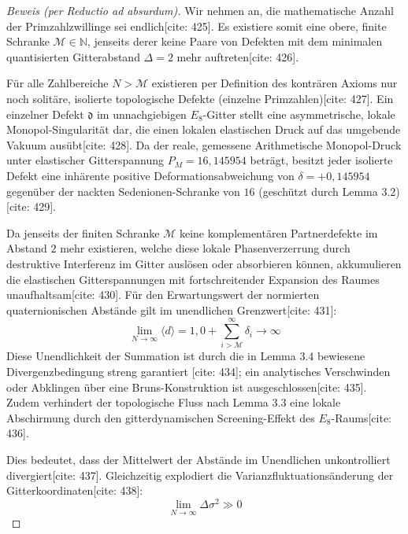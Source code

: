 \documentclass[11pt,a4paper]{article}
\newcommand{\Eoct}{E_8}
\theoremstyle{definition}
\begin{document}
	\begin{proof}[Beweis (per Reductio ad absurdum)]
		Wir nehmen an, die mathematische Anzahl der Primzahlzwillinge sei endlich[cite: 425]. Es existiere somit eine obere, finite Schranke $\mathcal{M} \in \mathbb{N}$, jenseits derer keine Paare von Defekten mit dem minimalen quantisierten Gitterabstand $\Delta = 2$ mehr auftreten[cite: 426].
		
		Für alle Zahlbereiche $N > \mathcal{M}$ existieren per Definition des konträren Axioms nur noch solitäre, isolierte topologische Defekte (einzelne Primzahlen)[cite: 427]. Ein einzelner Defekt $\mathfrak{d}$ im unnachgiebigen $\Eoct$-Gitter stellt eine asymmetrische, lokale Monopol-Singularität dar, die einen lokalen elastischen Druck auf das umgebende Vakuum ausübt[cite: 428]. Da der reale, gemessene Arithmetische Monopol-Druck unter elastischer Gitterspannung $P_M = 16{,}145954$ beträgt, besitzt jeder isolierte Defekt eine inhärente positive Deformationsabweichung von $\delta = +0{,}145954$ gegenüber der nackten Sedenionen-Schranke von $16$ (geschützt durch Lemma 3.2)[cite: 429].
		
		Da jenseits der finiten Schranke $\mathcal{M}$ keine komplementären Partnerdefekte im Abstand $2$ mehr existieren, welche diese lokale Phasenverzerrung durch destruktive Interferenz im Gitter auslösen oder absorbieren können, akkumulieren die elastischen Gitterspannungen mit fortschreitender Expansion des Raumes unaufhaltsam[cite: 430]. Für den Erwartungswert der normierten quaternionischen Abstände gilt im unendlichen Grenzwert[cite: 431]:
		\begin{equation}
			\lim_{N \rightarrow \infty} \langle d \rangle = 1{,}0 + \sum_{i > \mathcal{M}}^{\infty} \delta_i \longrightarrow \infty
		\end{equation}
		Diese Unendlichkeit der Summation ist durch die in Lemma 3.4 bewiesene Divergenzbedingung streng garantiert [cite: 434]; ein analytisches Verschwinden oder Abklingen über eine Bruns-Konstruktion ist ausgeschlossen[cite: 435]. Zudem verhindert der topologische Fluss nach Lemma 3.3 eine lokale Abschirmung durch den gitterdynamischen Screening-Effekt des $\Eoct$-Raums[cite: 436].
		
		Dies bedeutet, dass der Mittelwert der Abstände im Unendlichen unkontrolliert divergiert[cite: 437]. Gleichzeitig explodiert die Varianzfluktuationsänderung der Gitterkoordinaten[cite: 438]:
		\begin{equation}
			\lim_{N \rightarrow \infty} \Delta \sigma^2 \gg 0
		\end{equation}
		

\end{proof}
\end{document}
